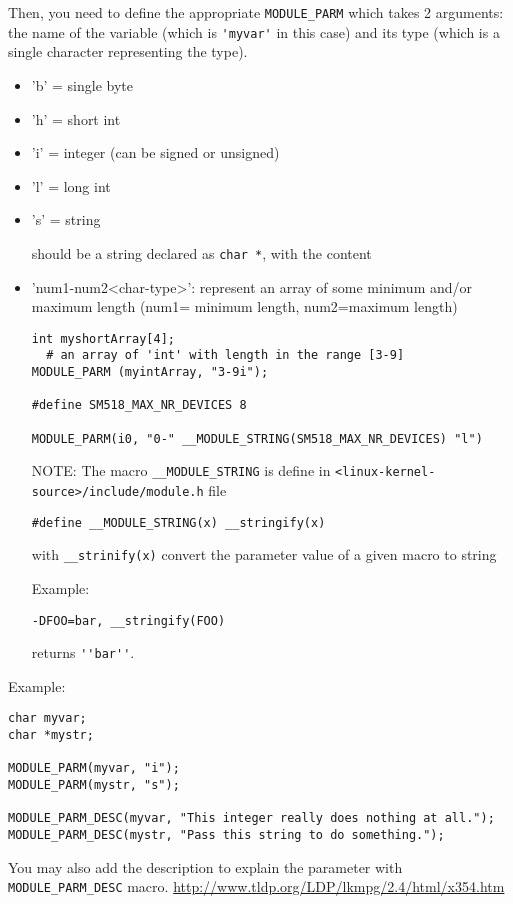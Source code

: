 Then, you need to define the appropriate \verb!MODULE_PARM!
which takes 2 arguments: the name of the variable (which is \verb!'myvar'! in
this case) and its type (which is a single character representing the type).
\begin{itemize}
  \item 'b' = single byte
  \item 'h' = short int
  \item 'i' = integer (can be signed or unsigned)
  \item 'l' = long int
  \item 's' = string

 should be a string declared as \verb!char *!, with the content
 
  \item 'num1-num2<char-type>': represent an array of some minimum and/or
  maximum length (num1= minimum length,  num2=maximum length)
   
\begin{verbatim}
int myshortArray[4];
  # an array of 'int' with length in the range [3-9]
MODULE_PARM (myintArray, "3-9i");

#define SM518_MAX_NR_DEVICES 8

MODULE_PARM(i0, "0-" __MODULE_STRING(SM518_MAX_NR_DEVICES) "l")
\end{verbatim}
NOTE: The macro \verb!__MODULE_STRING! is define in
\verb!<linux-kernel-source>/include/module.h! file
\begin{verbatim}
#define __MODULE_STRING(x) __stringify(x)
\end{verbatim}
with \verb!__strinify(x)! convert the parameter value of a given macro to string

Example:
\begin{verbatim}
-DFOO=bar, __stringify(FOO)
\end{verbatim}
returns \verb!''bar''!.

\end{itemize}
Example:
\begin{verbatim}
char myvar;
char *mystr;

MODULE_PARM(myvar, "i");
MODULE_PARM(mystr, "s");

MODULE_PARM_DESC(myvar, "This integer really does nothing at all.");
MODULE_PARM_DESC(mystr, "Pass this string to do something.");
\end{verbatim}
You may also add the description to explain the parameter with
\verb!MODULE_PARM_DESC! macro.
\url{http://www.tldp.org/LDP/lkmpg/2.4/html/x354.htm}

